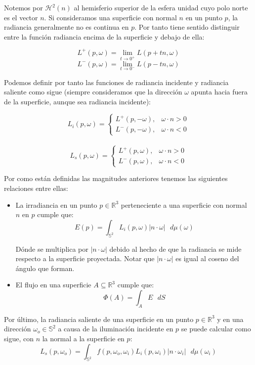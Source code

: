 \begin{itemize}
  Notemos por $\mathcal{H}^2(n)$ al hemisferio superior de la esfera unidad cuyo polo norte es el vector $n$. Si consideramos una superficie con normal $n$ en un punto $p$, la radiancia generalmente no es continua en $p$. Por tanto tiene sentido distinguir entre la función radiancia encima de la superficie y debajo de ella:

  $$L^+(p,\omega) = \lim_{t\rightarrow 0^+} L(p+tn, \omega)$$
  $$L^-(p,\omega) = \lim_{t\rightarrow 0^-} L(p-tn, \omega)$$

  Podemos definir por tanto las funciones de radiancia incidente y radiancia saliente como sigue (siempre consideramos que la dirección $\omega$ apunta hacia fuera de la superficie, aunque sea radiancia incidente):

  \[ L_i(p,\omega) = 
   \begin{cases} 
      L^+(p,- \omega ),  & \omega \cdot n > 0 \\
      L^-(p,- \omega ),  & \omega \cdot n < 0
   \end{cases}
  \] 
  \\
  \[L_s(p,\omega) = 
   \begin{cases} 
      L^+(p, \omega ),  & \omega \cdot n > 0 \\
      L^-(p,\omega ),  & \omega \cdot n < 0
   \end{cases}
  \] 
  
\end{itemize}

Por como están definidas las magnitudes anteriores tenemos las siguientes relaciones entre ellas:

\begin{itemize}
\item La irradiancia en un punto $p\in \mathds{R}^3$ perteneciente a una superficie con normal $n$ en $p$ cumple que:
  $$ E(p) = \int _{\mathds{S}^2} L_i(p,\omega ) |n \cdot \omega| \text{ } d\mu(\omega )$$

  Dónde se multiplica por $| n\cdot \omega |$ debido al hecho de que la radiancia se mide respecto a la superficie proyectada. Notar que $| n\cdot \omega |$ es igual al coseno del ángulo que forman.

\item El flujo en una superficie $A\subseteq \mathds{R}^3$ cumple que:
  $$\Phi (A)= \int _A E\text{ }dS$$
\end{itemize}

Por último, la radiancia saliente de una superficie en un punto $p \in \mathds{R}^3$ y en una dirección $\omega _o \in \mathds{S}^2$ a causa de la iluminación incidente en $p$ se puede calcular como sigue, con $n$ la normal a la superficie en $p$:
\begin{equation}\label{dispersion}
L_s(p,\omega _o) = \int _{\mathds{S}^2}f(p,\omega _o, \omega _i) L_i(p, \omega _i) |n\cdot \omega _i|\text{ }d\mu (\omega _i)
\end{equation}

